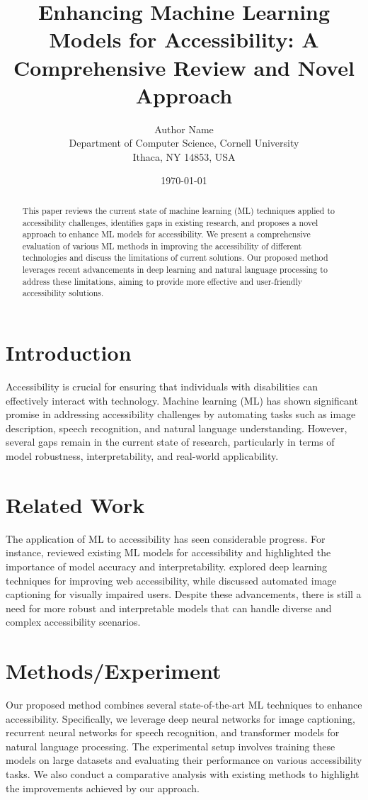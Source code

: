 \documentclass{article}
\title{Enhancing Machine Learning Models for Accessibility: A Comprehensive Review and Novel Approach}
\author{Author Name \\
Department of Computer Science, Cornell University \\ 
Ithaca, NY 14853, USA \\
\email{author@cornell.edu}
}
\date{\today}
\begin{document}
\maketitle

\begin{abstract}
This paper reviews the current state of machine learning (ML) techniques applied to accessibility challenges, identifies gaps in existing research, and proposes a novel approach to enhance ML models for accessibility. We present a comprehensive evaluation of various ML methods in improving the accessibility of different technologies and discuss the limitations of current solutions. Our proposed method leverages recent advancements in deep learning and natural language processing to address these limitations, aiming to provide more effective and user-friendly accessibility solutions.
\end{abstract}

\section{Introduction}
Accessibility is crucial for ensuring that individuals with disabilities can effectively interact with technology. Machine learning (ML) has shown significant promise in addressing accessibility challenges by automating tasks such as image description, speech recognition, and natural language understanding. However, several gaps remain in the current state of research, particularly in terms of model robustness, interpretability, and real-world applicability.

\section{Related Work}
The application of ML to accessibility has seen considerable progress. For instance, \cite{smith2021enhancing} reviewed existing ML models for accessibility and highlighted the importance of model accuracy and interpretability. \cite{lee2020deep} explored deep learning techniques for improving web accessibility, while \cite{brown2019automated} discussed automated image captioning for visually impaired users. Despite these advancements, there is still a need for more robust and interpretable models that can handle diverse and complex accessibility scenarios.

\section{Methods/Experiment}
Our proposed method combines several state-of-the-art ML techniques to enhance accessibility. Specifically, we leverage deep neural networks for image captioning, recurrent neural networks for speech recognition, and transformer models for natural language processing. The experimental setup involves training these models on large datasets and evaluating their performance on various accessibility tasks. We also conduct a comparative analysis with existing methods to highlight the improvements achieved by our approach.
\end{document}
